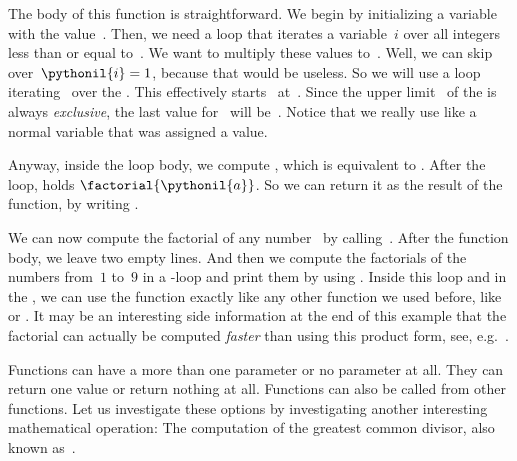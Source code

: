 The body of this function is straightforward.
We begin by initializing a variable  with the value~.
Then, we need a loop that iterates a variable~$i$ over all integers less than or equal to~.
We want to multiply these values to~.
Well, we can skip over~$\pythonil{i}=1$, because that would be useless.
So we will use a  loop iterating~ over the .
This effectively starts~ at~.
Since the upper limit~ of the  is always \emph{exclusive}, the last value for~ will be~.
Notice that we really use  like a normal variable that was assigned a value.%
%
\begin{sloppypar}%
Anyway, inside the loop body, we compute \pythonIdx{*=}, which is equivalent to .
After the loop,  holds $\factorial{\pythonil{a}}$.
So we can return it as the result of the function, by writing .%
\end{sloppypar}%
%
We can now compute the factorial of any number~ by calling~.
After the function body, we leave two empty lines.
And then we compute the factorials of the numbers from~$1$ to~$9$ in a -loop and print them by using .
Inside this loop and in the , we can use the function  exactly like any other function we used before, like  or .
It may be an interesting side information at the end of this example that the factorial can actually be computed \emph{faster} than using this product form, see, e.g.~\cite{L2015ANKOFF}.

%

Functions can have a more than one parameter or no parameter at all.
They can return one value or return nothing at all.
Functions can also be called from other functions.
Let us investigate these options by investigating another interesting mathematical operation:
The computation of the greatest common divisor, also known as~.


